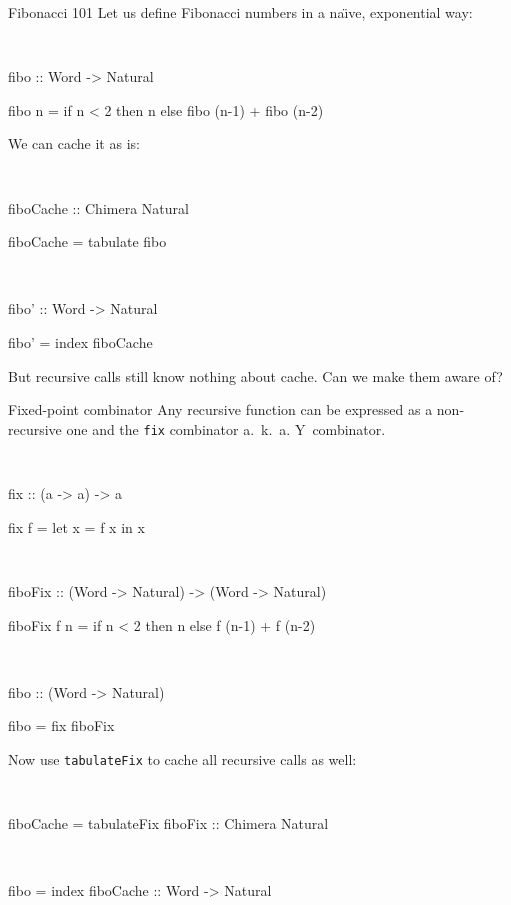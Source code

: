 \documentclass[handout]{beamer}
\begin{document}
\begin{frame}{Fibonacci 101}
Let us define Fibonacci numbers in a na\"{\i}ve, exponential way:

\bigskip

{\tt
\par fibo :: Word -> Natural
\par fibo n = if n < 2 then n else fibo (n-1) + fibo (n-2)
}

\bigskip

\pause

We can cache it as is:

\bigskip

{\tt
\par fiboCache :: Chimera Natural
\par fiboCache = tabulate fibo
\par ~
\par fibo' :: Word -> Natural
\par fibo' = index fiboCache
}

\bigskip

But recursive calls still know nothing about cache. Can we make them aware of?

\end{frame}


\begin{frame}{Fixed-point combinator}
\pause
Any recursive function can be expressed as a non-recursive one and the {\tt fix} combinator
a.~k.~a. Y~combinator.

\bigskip

{\tt
\par fix :: (a -> a) -> a
\par fix f = let x = f x in x
}

\bigskip

\pause

{\tt
\par fiboFix :: (Word -> Natural) -> (Word -> Natural)
\par fiboFix f n = if n < 2 then n else f (n-1) + f (n-2)
\par ~
\par fibo :: (Word -> Natural)
\par fibo = fix fiboFix
}

\bigskip

\pause
Now use {\tt tabulateFix} to cache all recursive calls as well:

\bigskip

{\tt
\par fiboCache = tabulateFix fiboFix :: Chimera Natural
\par ~
\par fibo = index fiboCache :: Word -> Natural
}

\end{frame}
\end{document}
